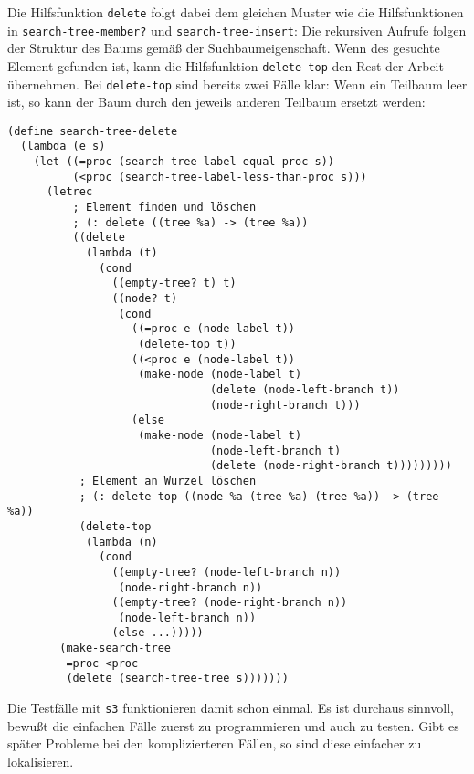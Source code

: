 %
Die Hilfsfunktion \texttt{delete} folgt dabei dem gleichen Muster wie
die Hilfsfunktionen in \texttt{search-tree-member?} und
\texttt{search-tree-insert}: Die rekursiven Aufrufe folgen der
Struktur des Baums gemäß der Suchbaumeigenschaft.  Wenn des gesuchte
Element gefunden ist, kann die Hilfsfunktion \texttt{delete-top} den
Rest der Arbeit übernehmen.  Bei \texttt{delete-top} sind bereits zwei
Fälle klar: Wenn ein Teilbaum leer ist, so kann der Baum durch den
jeweils anderen Teilbaum ersetzt werden:
%
\begin{verbatim}
(define search-tree-delete
  (lambda (e s)
    (let ((=proc (search-tree-label-equal-proc s))
          (<proc (search-tree-label-less-than-proc s)))
      (letrec
          ; Element finden und löschen
          ; (: delete ((tree %a) -> (tree %a))
          ((delete
            (lambda (t)
              (cond
                ((empty-tree? t) t)
                ((node? t)
                 (cond
                   ((=proc e (node-label t))
                    (delete-top t))
                   ((<proc e (node-label t))
                    (make-node (node-label t)
                               (delete (node-left-branch t))
                               (node-right-branch t)))
                   (else
                    (make-node (node-label t)
                               (node-left-branch t)
                               (delete (node-right-branch t)))))))))
           ; Element an Wurzel löschen
           ; (: delete-top ((node %a (tree %a) (tree %a)) -> (tree %a))
           (delete-top
            (lambda (n)
              (cond
                ((empty-tree? (node-left-branch n))
                 (node-right-branch n))
                ((empty-tree? (node-right-branch n))
                 (node-left-branch n))
                (else ...)))))
        (make-search-tree
         =proc <proc
         (delete (search-tree-tree s)))))))
\end{verbatim}
%
Die Testfälle mit \texttt{s3} funktionieren damit schon einmal.  Es
ist durchaus sinnvoll, bewußt die einfachen Fälle zuerst zu
programmieren und auch zu testen.  Gibt es später Probleme bei den
komplizierteren Fällen, so sind diese einfacher zu lokalisieren.

